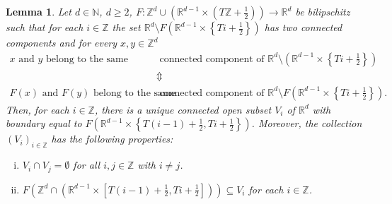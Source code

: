 \documentclass[a4paper, bibliography=totoc]{scrartcl}
\newtheorem{lemma}[define]{Lemma}
\numberwithin{claimcounter}{define}
\newcommand{\R}{\mathbb{R}}
\newcommand{\Z}{\mathbb{Z}}
\newcommand{\N}{\mathbb{N}}
\newcommand{\set}[1]{\left\{#1\right\}}
\newcommand{\br}[1]{\left(#1\right)}
\newcommand{\sqbr}[1]{\left[#1\right]}
\begin{document}
\begin{lemma}\label{lemma:well_separating}
	Let $d\in\N$, $d\geq 2$, $F\colon \Z^{d}\cup\br{\R^{d-1}\times \br{T\Z+\frac{1}{2}}}\to\R^{d}$ be bilipschitz such that for each $i\in\Z$ the set $\R^{d}\setminus F\br{\R^{d-1}\times\set{Ti+\frac{1}{2}}}$ has two connected components and for every $x,y\in\Z^{d}$
	\begin{align}
	\text{$x$ and $y$ belong to the same} &\text{ connected component of $\R^{d}\setminus \br{\R^{d-1}\times\set{Ti+\frac{1}{2}}}$}\nonumber\\
	&\Updownarrow\label{eq:separation}\\
	\text{$F(x)$ and $F(y)$ belong to the same} &\text{ connected component of $\R^{d}\setminus F\br{\R^{d-1}\times\set{Ti+\frac{1}{2}}}$.}\nonumber
	\end{align}
	Then, for each $i\in\Z$, there is a unique connected open subset $V_{i}$ of $\R^{d}$ with boundary equal to $F\br{\R^{d-1}\times\set{T(i-1)+\frac{1}{2},Ti+\frac{1}{2}}}$. Moreover, the collection $(V_{i})_{i\in\Z}$ has the following properties:
	\begin{enumerate}[(i)]
		\item\label{Vi} $V_{i}\cap V_{j}=\emptyset$ for all $i,j\in\Z$ with $i\neq j$.
		\item\label{images_in_Vi} $\displaystyle F\br{\Z^{d}\cap \br{\R^{d-1}\times\sqbr{T(i-1)+\frac{1}{2},Ti+\frac{1}{2}}}}\subseteq V_{i}$ for each $i\in\Z$.
	\end{enumerate}
\end{lemma}
\end{document}
